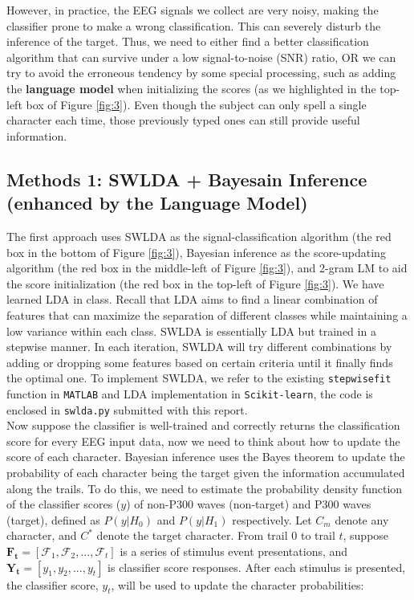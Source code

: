 \documentclass{article}
\begin{document}
\vspace{-3mm}
However, in practice, the EEG signals we collect are very noisy, making the classifier prone to make a wrong classification. This can severely disturb the inference of the target. Thus, we need to either find a better classification algorithm that can survive under a low signal-to-noise (SNR) ratio, OR we can try to avoid the erroneous tendency by some special processing, such as adding the \textbf{language model} when initializing the scores (as we highlighted in the top-left box of Figure \ref{fig:3}). Even though the subject can only spell a single character each time, those previously typed ones can still provide useful information.



\subsection{Methods 1: SWLDA + Bayesain Inference (enhanced by the Language Model)} \label{SWLDA}
The first approach uses SWLDA as the signal-classification algorithm (the red box in the bottom of Figure \ref{fig:3}), Bayesian inference as the score-updating algorithm (the red box in the middle-left of Figure \ref{fig:3}), and 2-gram LM to aid the score initialization (the red box in the top-left of Figure \ref{fig:3}). We have learned LDA in class. Recall that LDA aims to find a linear combination of features that can maximize the separation of different classes while maintaining a low variance within each class. SWLDA is essentially LDA but trained in a stepwise manner. In each iteration, SWLDA will try different combinations by adding or dropping some features based on certain criteria until it finally finds the optimal one. To implement SWLDA, we refer to the existing \texttt{stepwisefit} function in \texttt{MATLAB} and LDA implementation in \texttt{Scikit-learn}, the code is enclosed in \texttt{swlda.py} submitted with this report.\\

\vspace{-3mm}
Now suppose the classifier is well-trained and correctly returns the classification score for every EEG input data, now we need to think about how to update the score of each character. Bayesian inference uses the Bayes theorem to update the probability of each character being the target given the information accumulated along the trails. To do this, we need to estimate the probability density function of the classifier scores ($y$) of non-P300 waves (non-target) and P300 waves (target), defined as $P(y|H_0)$ and $P(y|H_1)$ respectively. Let $C_m$ denote any character, and $C^*$ denote the target character. From trail $0$ to trail $t$, suppose $\boldsymbol{F_t}=[\mathcal{F}_1, \mathcal{F}_2, ..., \mathcal{F}_t]$ is a series of stimulus event presentations, and $\mathbf{Y_t} = [y_1, y_2, ..., y_t]$ is classifier score responses. After each stimulus is presented, the classifier score, $y_t$, will be used to update the character probabilities:
\end{document}

